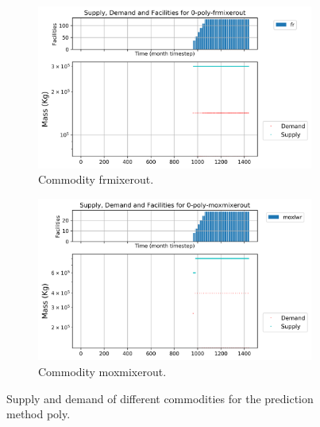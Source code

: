 \documentclass[11pt]{article}
\begin{document}
\begin{figure}[H]
	\centering
	\begin{subfigure}[]{0.45\textwidth}
		\centering
		\includegraphics[width=\linewidth]{29-figures/0-poly-frmixerout.png} 
		\caption{Commodity frmixerout.}
		\label{fig:29-frmixerout}
	\end{subfigure}
	\vspace{1cm}
	\begin{subfigure}[]{0.45\textwidth}
		\centering
		\includegraphics[width=\linewidth]{29-figures/0-poly-moxmixerout.png} 
		\caption{Commodity moxmixerout.}
		\label{fig:29-moxmixerout}
	\end{subfigure}
	\hfill
	\caption{Supply and demand of different commodities for the prediction method poly.}
	\label{fig:29-mix}
\end{figure}
\end{document}
